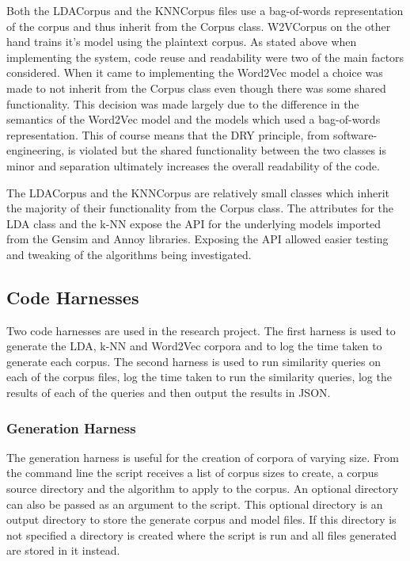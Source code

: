 Both the LDACorpus and the KNNCorpus files use a bag-of-words representation of the corpus and thus inherit from the Corpus class.
W2VCorpus on the other hand trains it's model using the plaintext corpus.
As stated above when implementing the system, code reuse and readability were two of the main factors considered.
When it came to implementing the Word2Vec model a choice was made to not inherit from the Corpus class even though there was some shared functionality.
This decision was made largely due to the difference in the semantics of the Word2Vec model and the models which used a bag-of-words representation.
This of course means that the DRY principle, from software-engineering, is violated but the shared functionality between the two classes is minor and separation ultimately increases the overall readability of the code.

The LDACorpus and the KNNCorpus are relatively small classes which inherit the majority of their functionality from the Corpus class.
The attributes for the LDA class and the k-NN expose the API for the underlying models imported from the Gensim and Annoy libraries.
Exposing the API allowed easier testing and tweaking of the algorithms being investigated.

\subsection{Code Harnesses}
Two code harnesses are used in the research project. The first harness is used to generate the LDA, k-NN and Word2Vec corpora and to log the time taken to generate each corpus.
The second harness is used to run similarity queries on each of the corpus files, log the time taken to run the similarity queries, log the results of each of the queries and then output the results in JSON.

\subsubsection{Generation Harness}
The generation harness is useful for the creation of corpora of varying size.
From the command line the script receives a list of corpus sizes to create, a corpus source directory and the algorithm to apply to the corpus.
An optional directory can also be passed as an argument to the script.
This optional directory is an output directory to store the generate corpus and model files.
If this directory is not specified a directory is created where the script is run and all files generated are stored in it instead.


